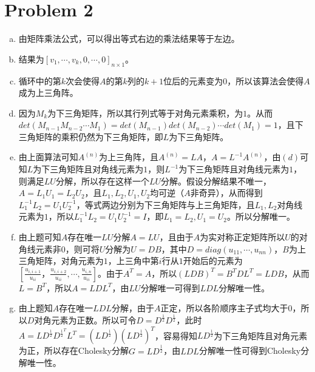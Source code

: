 \documentclass[a4paper,UTF8]{article}
\numberwithin{equation}{section}
\begin{document}
\section*{Problem 2}
\begin{enumerate}[(a)]
    \item 由矩阵乘法公式，可以得出等式右边的乘法结果等于左边。
    \item 结果为$[v_1,\cdots, v_k,0,\cdots,0]_{n\times 1}$。
    \item 循环中的第$k$次会使得$A$的第$k$列的$k+1$位后的元素变为$0$，所以该算法会使得$A$成为上三角阵。
    \item 因为$M_k$为下三角矩阵，所以其行列式等于对角元素乘积，为$1$。从而$det(M_{n-1}M_{n-2}\cdots M_1)=det(M_{n-1})det(M_{n-2})\cdots det(M_1)=1$，且下三角矩阵的乘积仍然为下三角矩阵，即$L$为下三角矩阵。
    \item 由上面算法可知$A^{(n)}$为上三角阵，且$A^{(n)}=LA$，$A=L^{-1}A^{(n)}$，由$(d)$可知$L$为下三角矩阵且对角线元素为$1$，则$L^{-1}$为下三角矩阵且对角线元素为$1$，则满足$LU$分解，所以存在这样一个$LU$分解。假设分解结果不唯一，$A=L_1U_1=L_2U_2$，且$L_1,L_2,U_1,U_2$均可逆（$A$非奇异），从而得到$L_1^{-1}L_2=U_1U_2^{-1}$，等式两边分别为下三角矩阵与上三角矩阵，且$L_1,L_2$对角线元素为$1$，所以$L_1^{-1}L_2=U_1U_2^{-1}=I$，即$L_1=L_2,U_1=U_2$。所以分解唯一。
    \item 由上题可知$A$存在唯一$LU$分解$A=LU$，且由于$A$为实对称正定矩阵所以$U$的对角线元素非$0$，则可将$U$分解为$U=DB$，其中$D=diag(u_{11},\cdots,u_{nn})$，$B$为上三角矩阵，对角元素为$1$，上三角中第$i$行从$1$开始后的元素为$[\frac{u_{i,i+1}}{u_{ii}}，\frac{u_{i,i+2}}{u_{ii}},\cdots, \frac{u_{i,n}}{u_{ii}}]$。由于$A^T=A$，所以$(LDB)^T=B^TDL^T=LDB$，从而$L=B^T$，所以$A=LDL^T$，由$LU$分解唯一可得到$LDL$分解唯一性。
    \item 由上题知$A$存在唯一$LDL$分解，由于$A$正定，所以各阶顺序主子式均大于$0$，所以$D$对角元素为正数。所以可令$D=D^{\frac{1}{2}}D^{\frac{1}{2}}$，此时$A=LD^{\frac{1}{2}}D^{\frac{1}{2}}^TL^T=(LD^{\frac{1}{2}})(LD^{\frac{1}{2}})^T$，容易得知$LD^{\frac{1}{2}}$为下三角矩阵且对角元素为正，所以存在Cholesky分解$G=LD^{\frac{1}{2}}$，由$LDL$分解唯一性可得到Cholesky分解唯一性。
\end{enumerate}
\end{document}
